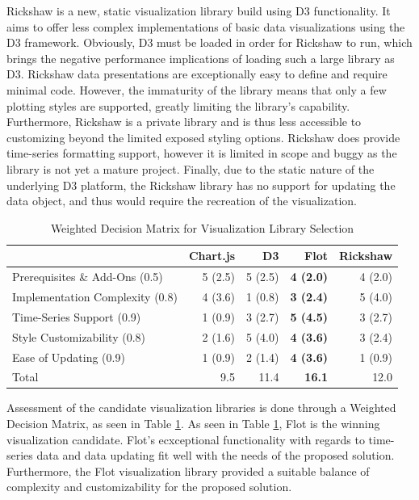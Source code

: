 \documentclass{report}
\begin{document}
Rickshaw is a new, static visualization library build using D3 functionality. It aims to offer less complex implementations of basic data visualizations using the D3 framework. Obviously, D3 must be loaded in order for Rickshaw to run, which brings the negative performance implications of loading such a large library as D3. Rickshaw data presentations are exceptionally easy to define and require minimal code. However, the immaturity of the library means that only a few plotting styles are supported, greatly limiting the library's capability. Furthermore, Rickshaw is a private library and is thus less accessible to customizing beyond the limited exposed styling options. Rickshaw does provide time-series formatting support, however it is limited in scope and buggy as the library is not yet a mature project. Finally, due to the static nature of the underlying D3 platform, the Rickshaw library has no support for updating the data object, and thus would require the recreation of the visualization.

\begin{table}
\centering
    \begin{tabular}{l | r r r r}
    ~                               & Chart.js & D3      & \textbf{Flot}    & Rickshaw \\ \hline
    Prerequisites \& Add-Ons (0.5)  & 5 (2.5)  & 5 (2.5) & \textbf{4 (2.0)} & 4 (2.0)  \\
    Implementation Complexity (0.8) & 4 (3.6)  & 1 (0.8) & \textbf{3 (2.4)} & 5 (4.0)  \\
    Time-Series Support (0.9)       & 1 (0.9)  & 3 (2.7) & \textbf{5 (4.5)} & 3 (2.7)  \\
    Style Customizability (0.8)     & 2 (1.6)  & 5 (4.0) & \textbf{4 (3.6)} & 3 (2.4)  \\
    Ease of Updating (0.9)          & 1 (0.9)  & 2 (1.4) & \textbf{4 (3.6)} & 1 (0.9)  \\ \hline
    Total                           & 9.5      & 11.4    & \textbf{16.1}    & 12.0     \\
    \end{tabular}
\caption{Weighted Decision Matrix for Visualization Library Selection}
\label{table:visualization-matrix}
\end{table}

Assessment of the candidate visualization libraries is done through a Weighted Decision Matrix, as seen in Table \ref{table:visualization-matrix}. As seen in Table \ref{table:visualization-matrix}, Flot is the winning visualization candidate. Flot's ecxceptional functionality with regards to time-series data and data updating fit well with the needs of the proposed solution. Furthermore, the Flot visualization library provided a suitable balance of complexity and customizability for the proposed solution.
\end{document}
